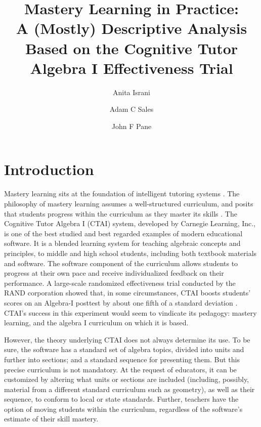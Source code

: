 \documentclass[12pt]{article}\usepackage[]{graphicx}\usepackage[]{color}
\title{Mastery Learning in Practice:\\
A (Mostly) Descriptive Analysis Based on the Cognitive Tutor Algebra I Effectiveness Trial}
\author{Anita Israni \and Adam C Sales \and John F Pane}
\begin{document}
\maketitle

\section{Introduction}
Mastery learning sits at the foundation of intelligent tutoring
systems \citep[e.g.][]{corbett2001cognitive,wenger2014artificial}.
The philosophy of mastery learning assumes a well-structured
curriculum, and posits that students progress within the curriculum as
they master its skills
\citep{bloom1968learning,kulik1990effectiveness}. The Cognitive Tutor
Algebra I (CTAI) system, developed by Carnegie Learning, Inc., is one of the best studied and best regarded examples of modern educational software. It is a blended learning system for teaching algebraic concepts and principles, to middle and high school students, including both textbook materials and software. The software component of the curriculum allows students to progress at their own pace and receive individualized feedback on their performance. A large-scale randomized effectiveness trial conducted by the RAND corporation showed that, in some circumstances, CTAI boosts students' scores on an Algebra-I posttest by about one fifth of a standard deviation \citep{pane2014effectiveness}. CTAI's success in this experiment would seem to vindicate its pedagogy: mastery learning, and the algebra I curriculum on which it is based.

However, the theory underlying CTAI does not always determine its use. To be sure, the software has a standard set of algebra topics, divided into units and further into sections; and a standard sequence for presenting them. But this precise curriculum is not mandatory. At the request of educators, it can be customized by altering what units or sections are included (including, possibly, material from a different standard curriculum such as geometry), as well as their sequence, to conform to local or state standards. Further, teachers have the option of moving students within the curriculum, regardless of the software's estimate of their skill mastery.
\end{document}
